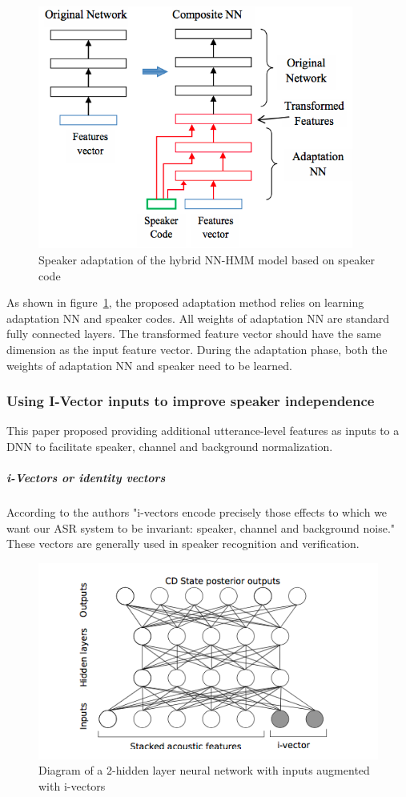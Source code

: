\begin{figure}
\includegraphics[height=8cm, width=\textwidth,keepaspectratio]{speaker.png}
\caption{\label{fig:speaker}{Speaker adaptation of the hybrid NN-HMM model based on speaker code}}
\end{figure}

As shown in figure~\ref{fig:speaker}, the proposed adaptation method relies on learning adaptation NN and speaker codes. All weights of adaptation NN are standard fully connected layers. The transformed feature vector should have the same dimension as the input feature vector. During the adaptation phase, both the weights of adaptation NN and speaker need to be learned.

\subsubsection{Using I-Vector inputs to improve speaker independence}

This paper\cite{42536} proposed providing additional utterance-level features as inputs to a DNN to facilitate speaker, channel and background normalization.
\subparagraph{i-Vectors or identity vectors} According to the authors "i-vectors encode precisely those effects to which we want our ASR system to be invariant: speaker, channel and background noise." These vectors are generally used in speaker recognition and verification.\\

\begin{figure}
\includegraphics[width=\textwidth]{i-vectors.png}
\caption{\label{fig:i-vectors}{Diagram of a 2-hidden layer neural network with inputs augmented with i-vectors}}
\end{figure}

